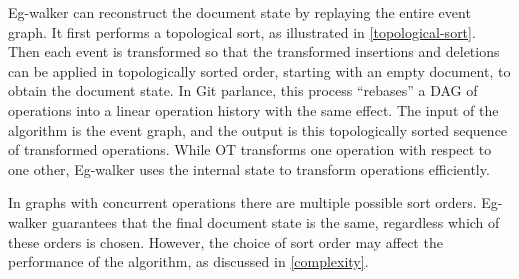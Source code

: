 \documentclass[sigplan,10pt]{acmart}
\newcommand{\algname}{Eg-walker\xspace}
\begin{document}
\algname can reconstruct the document state by replaying the entire event graph.
It first performs a topological sort, as illustrated in \autoref{topological-sort}. Then each event is transformed so that the transformed insertions and deletions can be applied in topologically sorted order, starting with an empty document, to obtain the document state.
In Git parlance, this process ``rebases'' a DAG of operations into a linear operation history with the same effect.
The input of the algorithm is the event graph, and the output is this topologically sorted sequence of transformed operations.
While OT transforms one operation with respect to one other, \algname uses the internal state to transform operations efficiently.

In graphs with concurrent operations there are multiple possible sort orders. \algname guarantees that the final document state is the same, regardless which of these orders is chosen. However, the choice of sort order may affect the performance of the algorithm, as discussed in \autoref{complexity}.
\end{document}
